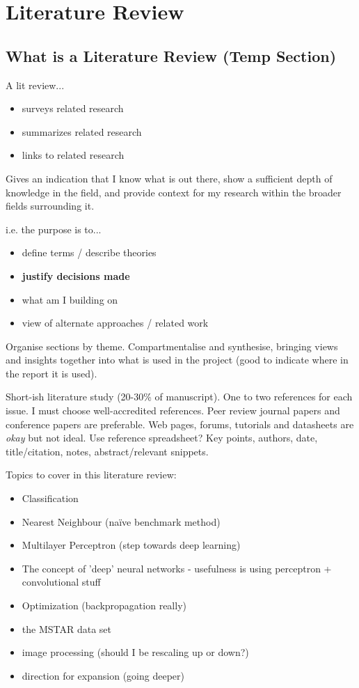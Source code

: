 \chapter{Literature Review}

\section{What is a Literature Review (Temp Section)}
A lit review...

\begin{itemize}
	\item surveys related research
	\item summarizes related research
	\item links to related research
\end{itemize}

Gives an indication that I know what is out there, show a sufficient depth of knowledge in the field, and provide context for my research within the broader fields surrounding it.

i.e. the purpose is to...

\begin{itemize}
	\item define terms / describe theories
	\item \textbf{justify decisions made}
	\item what am I building on
	\item view of alternate approaches / related work
\end{itemize}

Organise sections by theme. Compartmentalise and synthesise, bringing views and insights together into what is used in the project (good to indicate where in the report it is used). 

Short-ish literature study (20-30\% of manuscript). One to two references for each issue. I must choose well-accredited references. Peer review journal papers and conference papers are preferable. Web pages, forums, tutorials and datasheets are \textit{okay} but not ideal.
Use reference spreadsheet? Key points, authors, date, title/citation, notes, abstract/relevant snippets.

Topics to cover in this literature review:

\begin{itemize}
	\item Classification
	\item Nearest Neighbour (na{\"i}ve benchmark method)
	\item Multilayer Perceptron (step towards deep learning)
	\item The concept of 'deep' neural networks - usefulness is using perceptron + convolutional stuff
	\item Optimization (backpropagation really)
	\item the MSTAR data set
	\item image processing (should I be rescaling up or down?)
	\item direction for expansion (going deeper)
\end{itemize}

